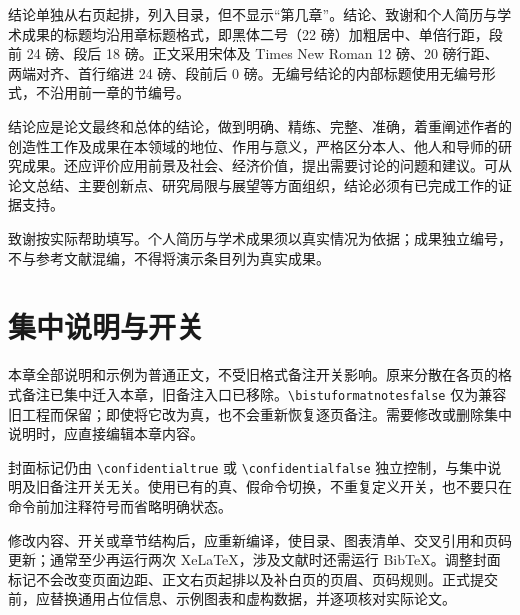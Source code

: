 结论单独从右页起排，列入目录，但不显示“第几章”。结论、致谢和个人简历与学术成果的标题均沿用章标题格式，即黑体二号（22 磅）加粗居中、单倍行距，段前 24 磅、段后 18 磅。正文采用宋体及 Times New Roman 12 磅、20 磅行距、两端对齐、首行缩进 24 磅、段前后 0 磅。无编号结论的内部标题使用无编号形式，不沿用前一章的节编号。

结论应是论文最终和总体的结论，做到明确、精练、完整、准确，着重阐述作者的创造性工作及成果在本领域的地位、作用与意义，严格区分本人、他人和导师的研究成果。还应评价应用前景及社会、经济价值，提出需要讨论的问题和建议。可从论文总结、主要创新点、研究局限与展望等方面组织，结论必须有已完成工作的证据支持。

致谢按实际帮助填写。个人简历与学术成果须以真实情况为依据；成果独立编号，不与参考文献混编，不得将演示条目列为真实成果。

\section{集中说明与开关}

本章全部说明和示例为普通正文，不受旧格式备注开关影响。原来分散在各页的格式备注已集中迁入本章，旧备注入口已移除。\verb|\bistuformatnotesfalse| 仅为兼容旧工程而保留；即使将它改为真，也不会重新恢复逐页备注。需要修改或删除集中说明时，应直接编辑本章内容。

封面标记仍由 \verb|\confidentialtrue| 或 \verb|\confidentialfalse| 独立控制，与集中说明及旧备注开关无关。使用已有的真、假命令切换，不重复定义开关，也不要只在命令前加注释符号而省略明确状态。

修改内容、开关或章节结构后，应重新编译，使目录、图表清单、交叉引用和页码更新；通常至少再运行两次 XeLaTeX，涉及文献时还需运行 BibTeX。调整封面标记不会改变页面边距、正文右页起排以及补白页的页眉、页码规则。正式提交前，应替换通用占位信息、示例图表和虚构数据，并逐项核对实际论文。
